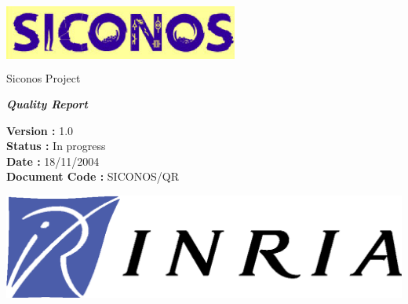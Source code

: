 


%

\thispagestyle{empty}

\begin{center}
\includegraphics[height=23mm, width=77mm]{figure/siconos.eps}\\
\textsf{Siconos Project}\\[6cm]
\end{center}

\begin{center}
\huge
\textsf{\textbf{\textit{Quality Report}}}\\[2.5cm]
\end{center}

\large
\begin{center}
\textsf{\textbf{Version :} 1.0}\\
\textsf{\textbf{Status :}  In progress}\\
\textsf{\textbf{Date : } 18/11/2004}\\
\textsf{\textbf{Document Code :} SICONOS/QR}\\[5cm]

\end{center}

\normalsize

\begin{flushright}
\includegraphics[scale=0.3]{figure/Logo-INRIA.eps}
\end{flushright}

\clearpage





